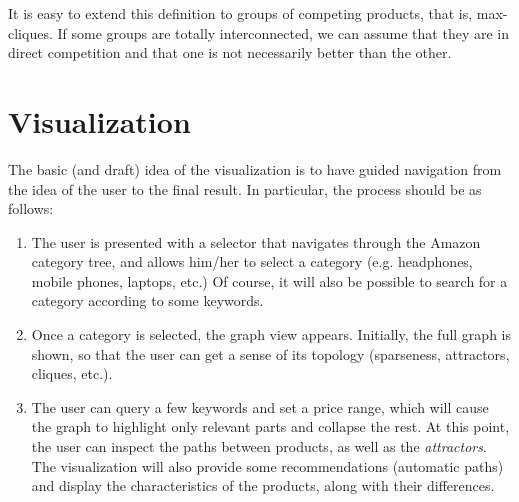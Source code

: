 \documentclass[a4paper,12pt]{article}
\begin{document}
It is easy to extend this definition to groups of competing products, that is, max-cliques. If some groups are totally interconnected, we can assume that they are in direct competition and that one is not necessarily better than the other.

\section{Visualization}
The basic (and draft) idea of the visualization is to have guided navigation from the idea of the user to the final result. In particular, the process should be as follows:
\begin{enumerate}
	\item The user is presented with a selector that navigates through the Amazon category tree, and allows him/her to select a category (e.g. headphones, mobile phones, laptops, etc.) Of course, it will also be possible to search for a category according to some keywords.
	\item Once a category is selected, the graph view appears. Initially, the full graph is shown, so that the user can get a sense of its topology (sparseness, attractors, cliques, etc.).
	\item The user can query a few keywords and set a price range, which will cause the graph to highlight only relevant parts and collapse the rest. At this point, the user can inspect the paths between products, as well as the \emph{attractors}. The visualization will also provide some recommendations (automatic paths) and display the characteristics of the products, along with their differences.
\end{enumerate}
\end{document}
